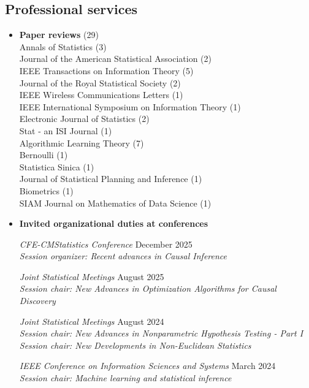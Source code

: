 \documentclass[letterpaper,12pt,oneside]{article}
\theoremstyle{definition}
\begin{document}
			\subsection*{Professional services}
			\begin{itemize}
				\item[]
				{\bf Paper reviews} (29)\\
				Annals of Statistics (3)\\
				Journal of the American Statistical Association (2)\\
				IEEE Transactions on Information Theory (5)\\
				Journal of the Royal Statistical Society (2) \\
				IEEE Wireless Communications Letters (1)\\
				IEEE International Symposium on Information Theory (1)\\
				Electronic Journal of Statistics (2)\\
				Stat - an ISI Journal (1)\\
				Algorithmic Learning Theory (7)\\
				Bernoulli (1)\\
				Statistica Sinica (1)\\
				Journal of Statistical Planning and Inference (1)\\
				Biometrics (1)\\
				SIAM Journal on Mathematics of Data Science (1)
				
				
				\item[] 
				{\bf Invited organizational duties at conferences}
				
				
				
				{\it CFE-CMStatistics Conference} \hfill December 2025\\
				{\it Session organizer: Recent advances in Causal Inference}
				
				{\it Joint Statistical Meetings} \hfill August 2025\\
				{\it Session chair: New Advances in Optimization Algorithms for Causal Discovery}
				
				
				{\it Joint Statistical Meetings} \hfill August 2024\\
				{\it Session chair: New Advances in Nonparametric Hypothesis Testing - Part I}\\
				{\it Session chair: New Developments in Non-Euclidean Statistics}
				
				{\it IEEE Conference on Information Sciences and Systems} \hfill March 2024\\
				{\it  Session chair: Machine learning and statistical inference}
				

\end{itemize}
\end{document}
